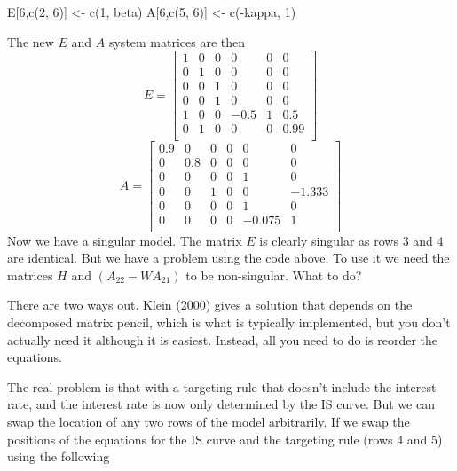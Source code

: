\documentclass[
  letterpaper,
]{book}
\newenvironment{Shaded}{\begin{snugshade}}{\end{snugshade}}
\newcommand{\DecValTok}[1]{\textcolor[rgb]{0.68,0.00,0.00}{#1}}
\newcommand{\FunctionTok}[1]{\textcolor[rgb]{0.28,0.35,0.67}{#1}}
\newcommand{\NormalTok}[1]{\textcolor[rgb]{0.00,0.23,0.31}{#1}}
\newcommand{\OtherTok}[1]{\textcolor[rgb]{0.00,0.23,0.31}{#1}}
\newcommand{\SpecialCharTok}[1]{\textcolor[rgb]{0.37,0.37,0.37}{#1}}
\begin{document}
\begin{Shaded}
\begin{Highlighting}[]
\NormalTok{E[}\DecValTok{6}\NormalTok{,}\FunctionTok{c}\NormalTok{(}\DecValTok{2}\NormalTok{, }\DecValTok{6}\NormalTok{)]     }\OtherTok{\textless{}{-}} \FunctionTok{c}\NormalTok{(}\DecValTok{1}\NormalTok{, beta)}
\NormalTok{A[}\DecValTok{6}\NormalTok{,}\FunctionTok{c}\NormalTok{(}\DecValTok{5}\NormalTok{, }\DecValTok{6}\NormalTok{)]     }\OtherTok{\textless{}{-}} \FunctionTok{c}\NormalTok{(}\SpecialCharTok{{-}}\NormalTok{kappa, }\DecValTok{1}\NormalTok{)}
\end{Highlighting}
\end{Shaded}

The new \(E\) and \(A\) system matrices are then \[  
E = \left[\begin{array}{r}1 &0 &0 &0 &0 &0 \\0 &1 &0 &0 &0 &0 \\0 &0 &1 &0 &0 &0 \\0 &0 &1 &0 &0 &0 \\1 &0 &0 &-0.5 &1 &0.5 \\0 &1 &0 &0 &0 &0.99 \\\end{array}\right] 
\] \[  
A = \left[\begin{array}{r}0.9 &0 &0 &0 &0 &0 \\0 &0.8 &0 &0 &0 &0 \\0 &0 &0 &0 &1 &0 \\0 &0 &1 &0 &0 &-1.333 \\0 &0 &0 &0 &1 &0 \\0 &0 &0 &0 &-0.075 &1 \\\end{array}\right] 
\] Now we have a singular model. The matrix \(E\) is clearly singular as
rows 3 and 4 are identical. But we have a problem using the code above.
To use it we need the matrices \(H\) and \((A_{22} - W A_{21})\) to be
non-singular. What to do?

There are two ways out. Klein (2000) gives a solution that depends on
the decomposed matrix pencil, which is what is typically implemented,
but you don't actually need it although it is easiest. Instead, all you
need to do is reorder the equations.

The real problem is that with a targeting rule that doesn't include the
interest rate, and the interest rate is now only determined by the IS
curve. But we can swap the location of any two rows of the model
arbitrarily. If we swap the positions of the equations for the IS curve
and the targeting rule (rows 4 and 5) using the following
\end{document}
